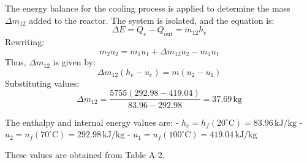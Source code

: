 The energy balance for the cooling process is applied to determine the mass \( \Delta m_{12} \) added to the reactor. The system is isolated, and the equation is:  
\[
\Delta E = Q_e - Q_{\text{out}} = \dot{m}_{12} h_e
\]  
Rewriting:  
\[
m_2 u_2 = m_1 u_1 + \Delta m_{12} u_2 - m_1 u_1
\]  
Thus, \( \Delta m_{12} \) is given by:  
\[
\Delta m_{12}(h_e - u_e) = m(u_2 - u_1)
\]  
Substituting values:  
\[
\Delta m_{12} = \frac{5755 \left( 292.98 - 419.04 \right)}{83.96 - 292.98} = 37.69 \, \text{kg}
\]  

The enthalpy and internal energy values are:  
- \( h_e = h_f(20^\circ\text{C}) = 83.96 \, \text{kJ/kg} \)  
- \( u_2 = u_f(70^\circ\text{C}) = 292.98 \, \text{kJ/kg} \)  
- \( u_1 = u_f(100^\circ\text{C}) = 419.04 \, \text{kJ/kg} \)  

These values are obtained from Table A-2.